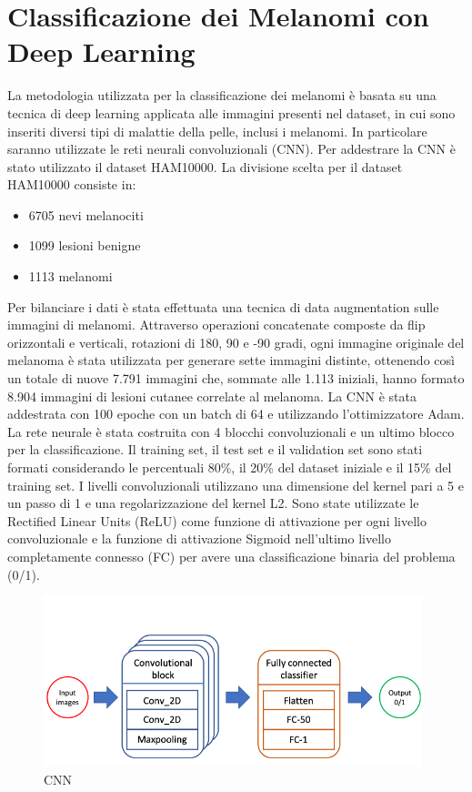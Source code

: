 {\section{Classificazione dei Melanomi con Deep Learning}
La metodologia utilizzata per la classificazione dei melanomi è basata su una tecnica di deep learning applicata alle immagini presenti nel dataset, in cui sono inseriti diversi tipi di malattie della pelle, inclusi i melanomi.
\newline
In particolare saranno utilizzate le reti neurali convoluzionali (CNN).
\newline
Per addestrare la CNN è stato utilizzato il dataset HAM10000.
La divisione scelta per il dataset HAM10000 consiste in:
\begin{itemize}
	\item 6705 nevi melanociti
	\item 1099 lesioni benigne
	\item 1113 melanomi
\end{itemize}
Per bilanciare i dati è stata effettuata una tecnica di data augmentation sulle immagini di melanomi.
\newline
Attraverso operazioni concatenate composte da flip orizzontali e verticali, rotazioni di 180, 90 e -90 gradi, ogni immagine originale del melanoma è stata utilizzata per generare sette immagini distinte, ottenendo così un totale di nuove 7.791 immagini che, sommate alle 1.113 iniziali, hanno formato 8.904 immagini di lesioni cutanee correlate al melanoma.
\newline
La CNN è stata addestrata con 100 epoche con un batch di 64 e utilizzando l'ottimizzatore Adam.
\newline
La rete neurale è stata costruita con 4 blocchi convoluzionali e un ultimo blocco per la classificazione. Il training set, il test set e il validation set sono stati formati considerando le percentuali 80\%, il 20\% del dataset iniziale e il 15\% del training set. 
I livelli convoluzionali utilizzano una dimensione del kernel pari a 5 e un passo di 1 e una regolarizzazione del kernel L2. 
Sono state utilizzate le Rectified Linear Units (ReLU) come funzione di attivazione per ogni livello convoluzionale e la funzione di attivazione Sigmoid nell'ultimo livello completamente connesso (FC) per avere una classificazione binaria del problema (0/1).
\begin{figure}[h]
	\begin{center}
		\includegraphics[scale=1]{figure/capitolo3/cnn1.png}
		\caption{CNN}	
	\end{center}
\end{figure}
\newpage
}
